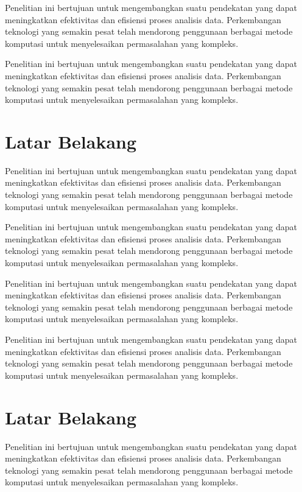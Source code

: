 Penelitian ini bertujuan untuk mengembangkan suatu pendekatan yang dapat meningkatkan efektivitas dan efisiensi proses analisis data. Perkembangan teknologi yang semakin pesat telah mendorong penggunaan berbagai metode komputasi untuk menyelesaikan permasalahan yang kompleks.

Penelitian ini bertujuan untuk mengembangkan suatu pendekatan yang dapat meningkatkan efektivitas dan efisiensi proses analisis data. Perkembangan teknologi yang semakin pesat telah mendorong penggunaan berbagai metode komputasi untuk menyelesaikan permasalahan yang kompleks.

\section{Latar Belakang}

Penelitian ini bertujuan untuk mengembangkan suatu pendekatan yang dapat meningkatkan efektivitas dan efisiensi proses analisis data. Perkembangan teknologi yang semakin pesat telah mendorong penggunaan berbagai metode komputasi untuk menyelesaikan permasalahan yang kompleks.

Penelitian ini bertujuan untuk mengembangkan suatu pendekatan yang dapat meningkatkan efektivitas dan efisiensi proses analisis data. Perkembangan teknologi yang semakin pesat telah mendorong penggunaan berbagai metode komputasi untuk menyelesaikan permasalahan yang kompleks.

Penelitian ini bertujuan untuk mengembangkan suatu pendekatan yang dapat meningkatkan efektivitas dan efisiensi proses analisis data. Perkembangan teknologi yang semakin pesat telah mendorong penggunaan berbagai metode komputasi untuk menyelesaikan permasalahan yang kompleks.

Penelitian ini bertujuan untuk mengembangkan suatu pendekatan yang dapat meningkatkan efektivitas dan efisiensi proses analisis data. Perkembangan teknologi yang semakin pesat telah mendorong penggunaan berbagai metode komputasi untuk menyelesaikan permasalahan yang kompleks.

\section{Latar Belakang}

Penelitian ini bertujuan untuk mengembangkan suatu pendekatan yang dapat meningkatkan efektivitas dan efisiensi proses analisis data. Perkembangan teknologi yang semakin pesat telah mendorong penggunaan berbagai metode komputasi untuk menyelesaikan permasalahan yang kompleks.

